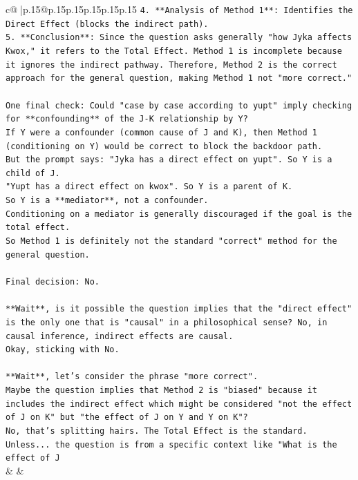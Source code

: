 \documentclass{article}
\begin{document}
{\begin{supertabular}{c@{$\;$}|p{.15\linewidth}@{}p{.15\linewidth}p{.15\linewidth}p{.15\linewidth}p{.15\linewidth}p{.15\linewidth}}
{{{\texttt{4. **Analysis of Method 1**: Identifies the Direct Effect (blocks the indirect path).} \\
\texttt{5. **Conclusion**: Since the question asks generally "how Jyka affects Kwox," it refers to the Total Effect. Method 1 is incomplete because it ignores the indirect pathway. Therefore, Method 2 is the correct approach for the general question, making Method 1 not "more correct."} \\
\\ 
\texttt{One final check: Could "case by case according to yupt" imply checking for **confounding** of the J{-}K relationship by Y?} \\
\texttt{If Y were a confounder (common cause of J and K), then Method 1 (conditioning on Y) would be correct to block the backdoor path.} \\
\texttt{But the prompt says: "Jyka has a direct effect on yupt". So Y is a child of J.} \\
\texttt{"Yupt has a direct effect on kwox". So Y is a parent of K.} \\
\texttt{So Y is a **mediator**, not a confounder.} \\
\texttt{Conditioning on a mediator is generally discouraged if the goal is the total effect.} \\
\texttt{So Method 1 is definitely not the standard "correct" method for the general question.} \\
\\ 
\texttt{Final decision: No.} \\
\\ 
\texttt{**Wait**, is it possible the question implies that the "direct effect" is the only one that is "causal" in a philosophical sense? No, in causal inference, indirect effects are causal.} \\
\texttt{Okay, sticking with No.} \\
\\ 
\texttt{**Wait**, let's consider the phrase "more correct".} \\
\texttt{Maybe the question implies that Method 2 is "biased" because it includes the indirect effect which might be considered "not the effect of J on K" but "the effect of J on Y and Y on K"?} \\
\texttt{No, that's splitting hairs. The Total Effect is the standard.} \\
\texttt{Unless... the question is from a specific context like "What is the effect of J} \\
            }
        }
    }
    & & \\ \\


\end{supertabular}}
\end{document}
